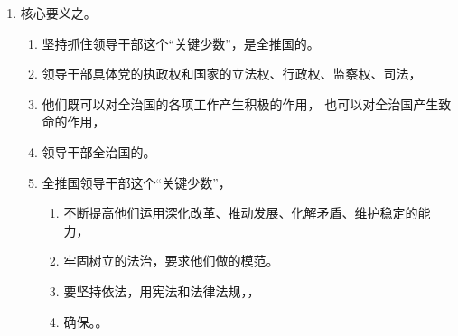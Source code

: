 \begin{enumerate}
\begin{enumerate}
\begin{enumerate}
                        \begin{enumerate}
                          \item 引导法律服务工作者，
                          \item 建立激励法律服务人才机制，
                          \item 逐步解决地区法律服务等问题。
                        \end{enumerate}
                  \item 要创新机制。
                        \begin{enumerate}
                          \item 坚持以法治思想为指导，，培养大批高法人，
                          \item 重视的法律人才培养地作用，
                                加强，
                                推进不同部门间的，
                                全方位提升。
                        \end{enumerate}
                \end{enumerate}
        \end{enumerate}
  \item 核心要义之。
        \begin{enumerate}
          \item 坚持抓住领导干部这个“关键少数”，是全推国的。
          \item 领导干部具体党的执政权和国家的立法权、行政权、监察权、司法，
          \item 他们既可以对全治国的各项工作产生积极的作用，
                也可以对全治国产生致命的作用，
          \item 领导干部全治国的。
          \item 全推国领导干部这个“关键少数”，
                \begin{enumerate}
                  \item 不断提高他们运用深化改革、推动发展、化解矛盾、维护稳定的能力，
                  \item 牢固树立的法治，要求他们做的模范。
                  \item 要坚持依法，用宪法和法律法规，，
                  \item 确保。。
                \end{enumerate}
        \end{enumerate}
\end{enumerate}